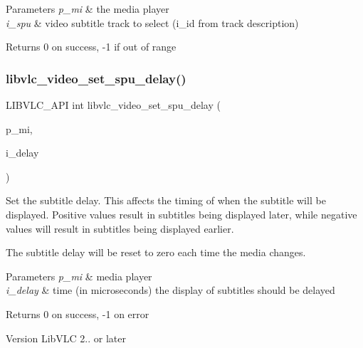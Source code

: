 \begin{DoxyParams}{Parameters}
{\em p\+\_\+mi} & the media player \\
\hline
{\em i\+\_\+spu} & video subtitle track to select (i\+\_\+id from track description) \\
\hline
\end{DoxyParams}
\begin{DoxyReturn}{Returns}
0 on success, -\/1 if out of range 
\end{DoxyReturn}
\mbox{\label{group__libvlc__video_ga98a515c9a91f3ac322fc720ac301f985}} 
\subsubsection{\texorpdfstring{libvlc\+\_\+video\+\_\+set\+\_\+spu\+\_\+delay()}{libvlc\_video\_set\_spu\_delay()}}
{\footnotesize\ttfamily L\+I\+B\+V\+L\+C\+\_\+\+A\+PI int libvlc\+\_\+video\+\_\+set\+\_\+spu\+\_\+delay (\begin{DoxyParamCaption}\item[{libvlc\+\_\+media\+\_\+player\+\_\+t $\ast$}]{p\+\_\+mi,  }\item[{int64\+\_\+t}]{i\+\_\+delay }\end{DoxyParamCaption})}

Set the subtitle delay. This affects the timing of when the subtitle will be displayed. Positive values result in subtitles being displayed later, while negative values will result in subtitles being displayed earlier.

The subtitle delay will be reset to zero each time the media changes.


\begin{DoxyParams}{Parameters}
{\em p\+\_\+mi} & media player \\
\hline
{\em i\+\_\+delay} & time (in microseconds) the display of subtitles should be delayed \\
\hline
\end{DoxyParams}
\begin{DoxyReturn}{Returns}
0 on success, -\/1 on error 
\end{DoxyReturn}
\begin{DoxyVersion}{Version}
Lib\+V\+LC 2.. or later 
\end{DoxyVersion}
\mbox{\label{group__libvlc__video_ga91d4f34cfedc53a90e3732b539b6c88f}} 

